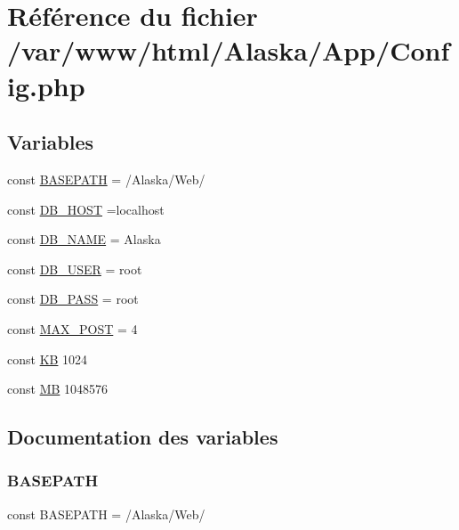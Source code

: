 \hypertarget{_config_8php}{}\section{Référence du fichier /var/www/html/\+Alaska/\+App/\+Config.php}
\label{_config_8php}
\subsection*{Variables}
\begin{DoxyCompactItemize}
\item 
const \hyperlink{_config_8php_ad39801cabfd338dc5524466fe793fda9}{B\+A\+S\+E\+P\+A\+TH} = \textquotesingle{}/Alaska/Web/\textquotesingle{}
\item 
const \hyperlink{_config_8php_a293363d7988627f671958e2d908c202a}{D\+B\+\_\+\+H\+O\+ST} =\textquotesingle{}localhost\textquotesingle{}
\item 
const \hyperlink{_config_8php_ab5db0d3504f917f268614c50b02c53e2}{D\+B\+\_\+\+N\+A\+ME} = \textquotesingle{}Alaska\textquotesingle{}
\item 
const \hyperlink{_config_8php_a1d1d99f8e08f387d84fe9848f3357156}{D\+B\+\_\+\+U\+S\+ER} = \textquotesingle{}root\textquotesingle{}
\item 
const \hyperlink{_config_8php_a8bb9c4546d91667cfa61879d83127a92}{D\+B\+\_\+\+P\+A\+SS} = \textquotesingle{}root\textquotesingle{}
\item 
const \hyperlink{_config_8php_ae6f0a6c86ad9f61cbc99ad3c4180b481}{M\+A\+X\+\_\+\+P\+O\+ST} = 4
\item 
const \hyperlink{_config_8php_a4f06cdd0c63f3ce691804d6c90ea6c32}{KB} 1024
\item 
const \hyperlink{_config_8php_a91c734126e699a6ba53fe57e06bb8b49}{MB} 1048576
\end{DoxyCompactItemize}


\subsection{Documentation des variables}
\mbox{\label{_config_8php_ad39801cabfd338dc5524466fe793fda9}} 
\subsubsection{\texorpdfstring{B\+A\+S\+E\+P\+A\+TH}{BASEPATH}}
{\footnotesize\ttfamily const B\+A\+S\+E\+P\+A\+TH = \textquotesingle{}/Alaska/Web/\textquotesingle{}}


